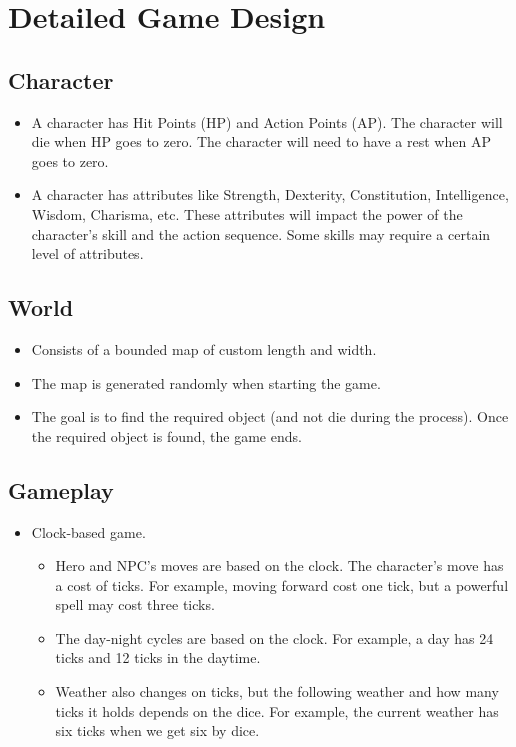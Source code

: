 \documentclass[10pt]{article}
\begin{document}
\section{Detailed Game Design}


\subsection{Character}

\begin{itemize}
\item A character has Hit Points (HP) and Action Points (AP). The character will die when HP goes to zero. The character will need to have a rest when AP goes to zero.
\item A character has attributes like Strength, Dexterity, Constitution, Intelligence, Wisdom, Charisma, etc. These attributes will impact the power of the character’s skill and the action sequence. Some skills may require a certain level of attributes.
\end{itemize}


\subsection{World}

\begin{itemize}
\item Consists of a bounded map of custom length and width.
\item The map is generated randomly when starting the game.
\item The goal is to find the required object (and not die during the process). Once the required object is found, the game ends.
\end{itemize}


\subsection{Gameplay}

\begin{itemize}
\item Clock-based game. 
    \begin{itemize}
    \item Hero and NPC’s moves are based on the clock. The character’s move has a cost of ticks. For example, moving forward cost one tick, but a powerful spell may cost three ticks.
    \item The day-night cycles are based on the clock. For example, a day has 24 ticks and 12 ticks in the daytime.
    \item Weather also changes on ticks, but the following weather and how many ticks it holds depends on the dice. For example, the current weather has six ticks when we get six by dice.
    \end{itemize}
\end{itemize}
\end{document}
